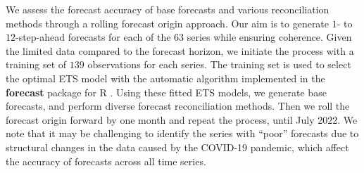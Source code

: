 \documentclass[
  11pt]{article}
\begin{document}
We assess the forecast accuracy of base forecasts and various
reconciliation methods through a rolling forecast origin approach. Our
aim is to generate \(1\)- to \(12\)-step-ahead forecasts for each of the
\(63\) series while ensuring coherence. Given the limited data compared
to the forecast horizon, we initiate the process with a training set of
\(139\) observations for each series. The training set is used to select
the optimal ETS model with the automatic algorithm implemented in the
\textbf{forecast} package for R \citep{HK08}. Using these fitted ETS
models, we generate base forecasts, and perform diverse forecast
reconciliation methods. Then we roll the forecast origin forward by one
month and repeat the process, until July 2022. We note that it may be
challenging to identify the series with ``poor'' forecasts due to
structural changes in the data caused by the COVID-19 pandemic, which
affect the accuracy of forecasts across all time series.
\end{document}
